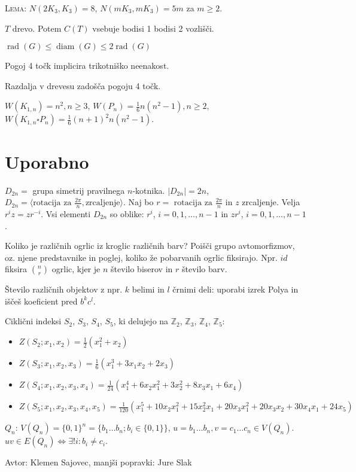 \documentclass[8pt,a4paper]{amsart}
\theoremstyle{definition} %
\theoremstyle{plain} %
\newcommand{\Z}{\mathbb Z}
\begin{document}
\textsc{Lema:} $N(2K_3,K_3)=8$, $N(mK_3,mK_3)=5m$ za $m\geq 2$.

$T$ drevo. Potem $C(T)$ vsebuje bodisi 1 bodisi 2 vozlišči.

$\operatorname{rad}(G) \leq \operatorname{diam}(G) \leq 2\operatorname{rad}(G)$

Pogoj 4 točk implicira trikotniško neenakost.

Razdalja v drevesu zadošča pogoju 4 točk.

$W(K_{1,n}) = n^2, n\geq 3$, $W(P_n) = \frac{1}{6}n(n^2-1), n\geq 2$, $W(K_{1,n}
\square P_n) = \frac{1}{6}(n+1)^2n(n^2-1)$.

\section{Uporabno}

$D_{2n} = $ grupa simetrij pravilnega $n$-kotnika. $|D_{2n}| = 2n$, $D_{2n} =
\langle \text{rotacija za }\frac{2\pi}{n},\text{zrcaljenje}\rangle$. Naj bo
$r=\text{ rotacija za }\frac{2\pi}{n}$ in $z$ zrcaljenje. Velja $r^iz =
zr^{-i}$. Vsi elementi $D_{2n}$ so oblike: $r^i$, $i=0,1,\ldots ,n-1$ in $zr^i$,
$i=0,1,\ldots ,n-1$.

Koliko je različnih ogrlic iz kroglic različnih barv? Poišči grupo
avtomorfizmov, oz. njene predstavnike in poglej, koliko že pobarvanih ogrlic
fiksirajo. Npr. $id$ fiksira $\binom{n}{r}$ ogrlic, kjer je $n$ število biserov
in $r$ število barv.

Število različnih objektov z npr. $k$ belimi in $l$ črnimi deli: uporabi izrek
Polya in iščeš koeficient pred $b^kc^l$.

Ciklični indeksi $S_2$, $S_3$, $S_4$, $S_5$, ki delujejo na $\Z_2$, $\Z_3$, $\Z_4$, $\Z_5$:
\begin{itemize}
 \item $Z(S_2;x_1,x_2)=\frac{1}{2}(x_1^2+x_2)$
 \item $Z(S_3;x_1,x_2,x_3)=\frac{1}{6}(x_1^3+3x_1x_2+2x_3)$
 \item $Z(S_4;x_1,x_2,x_3,x_4)=\frac{1}{24}(x_1^4+6x_2x_1^2+3x_2^2+8x_3x_1+6x_4)$
 \item $Z(S_5;x_1,x_2,x_3,x_4,x_5)=\frac{1}{120}(x_1^5+10x_2x_1^2+15x_2^2x_1+20x_3x_1^2+20x_3x_2+30x_4x_1+24x_5)$
\end{itemize}

$Q_n$: $V(Q_n) = \{0,1 \}^n = \{ b_1\ldots b_n; b_i \in \{0,1\} \}$,
$u=b_1\ldots b_n, v = c_1\ldots c_n \in V(Q_n)$. $uv \in E(Q_n)
\Longleftrightarrow \exists! i: b_i \neq c_i$.

\hfill Avtor: Klemen Sajovec, manjši popravki: Jure Slak
\end{document}
